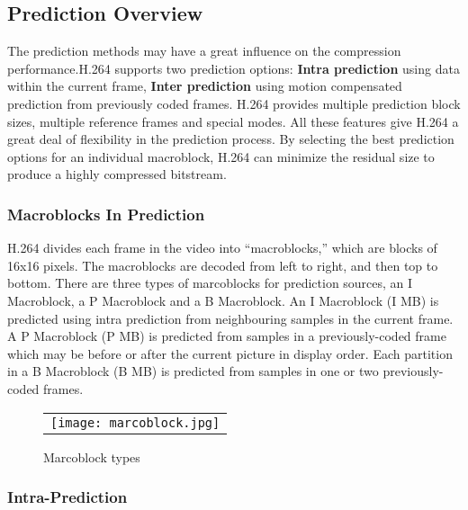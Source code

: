 \documentclass[../main.tex]{subfiles}
\begin{document}
\subsection{Prediction Overview}

The prediction methods may have a great influence on the compression performance.H.264 supports two prediction options: \textbf{Intra prediction} using data within
the current frame, \textbf{Inter prediction} using motion compensated prediction from previously
coded frames. H.264 provides multiple prediction block sizes, multiple reference frames and special modes. All these features give H.264 a great deal of flexibility in the prediction process. By selecting the best prediction options for an individual macroblock, H.264 can minimize the residual size to produce a highly compressed bitstream.



\subsubsection{ Macroblocks In Prediction }

H.264 divides each frame in the video into “macroblocks,” which are blocks of 16x16
pixels. The macroblocks are decoded from left to right, and then top to bottom. There are three types of marcoblocks for prediction sources, an I Macroblock, a P Macroblock and a B Macroblock. An I Macroblock (I MB) is predicted using intra prediction from
neighbouring samples in the current frame. A P Macroblock (P MB) is predicted from samples
in a previously-coded frame which may be before or after the current picture in display order.  Each partition in a B Macroblock (B MB) is
predicted from samples in one or two previously-coded frames.

  \begin{figure} [ht]
   \begin{center}
   \begin{tabular}{c} %
   \texttt{[image: marcoblock.jpg]}
   \end{tabular}
   \end{center}
   \caption[example] 
   { \label{fig:example} 
Marcoblock types }
   \end{figure}     %

\subsubsection{ Intra-Prediction }
\end{document}
